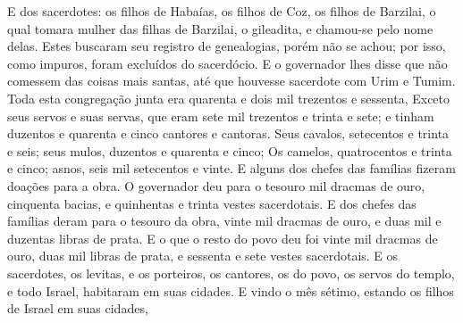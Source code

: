 {  E dos sacerdotes: os filhos de Habaías, os filhos de Coz, os filhos de Barzilai, o qual tomara mulher das filhas de Barzilai, o gileadita, e chamou-se pelo nome delas.
  Estes buscaram seu registro de genealogias, porém não se achou; por isso, como impuros, foram excluídos do sacerdócio.
  E o governador lhes disse que não comessem das coisas mais santas, até que houvesse sacerdote com Urim e Tumim.
  Toda esta congregação junta era quarenta e dois mil trezentos e sessenta,
  Exceto seus servos e suas servas, que eram sete mil trezentos e trinta e sete; e tinham duzentos e quarenta e cinco cantores e cantoras.
  Seus cavalos, setecentos e trinta e seis; seus mulos, duzentos e quarenta e cinco;
  Os camelos, quatrocentos e trinta e cinco; asnos, seis mil setecentos e vinte.
  E alguns dos chefes das famílias fizeram doações para a obra. O governador deu para o tesouro mil dracmas de ouro, cinquenta bacias, e quinhentas e trinta vestes sacerdotais. %
  E {} dos chefes das famílias deram para o tesouro da obra, vinte mil dracmas de ouro, e duas mil e duzentas libras de prata.
  E o que o resto do povo deu foi vinte mil dracmas de ouro, duas mil libras de prata, e sessenta e sete vestes sacerdotais.
  E os sacerdotes, os levitas, e os porteiros, os cantores, os do povo, os servos do templo, e todo Israel, habitaram em suas cidades. E vindo o mês sétimo, estando os filhos de Israel em suas cidades,
\par }

